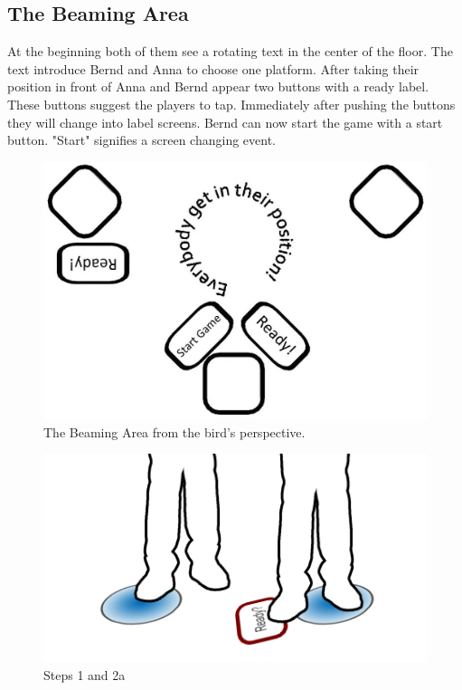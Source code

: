 \documentclass{sigchi}
\begin{document}
\subsection{The Beaming Area}
\vspace{3mm}
At the beginning both of them see a rotating text in the center of the floor. The text introduce Bernd and Anna to choose one platform. After taking their position in front of Anna and Bernd appear two buttons with a ready label. These buttons suggest the players to tap. Immediately after pushing the buttons they will change into label screens. Bernd can now start the game with a start button. "Start" signifies a screen changing event.


\begin{figure}[h]
\centering
\includegraphics[width=0.8\columnwidth]{beamingArea}
\caption{The Beaming Area from the bird's perspective.}
\label{fig:beamingArea}
\end{figure}


\begin{figure}[H]
\centering
\includegraphics[width=0.9\columnwidth]{walkthrough/klein/beamingarea1+2a}
\caption{Steps 1 and 2a}
\label{fig:gamingArea}
\end{figure}
\end{document}
